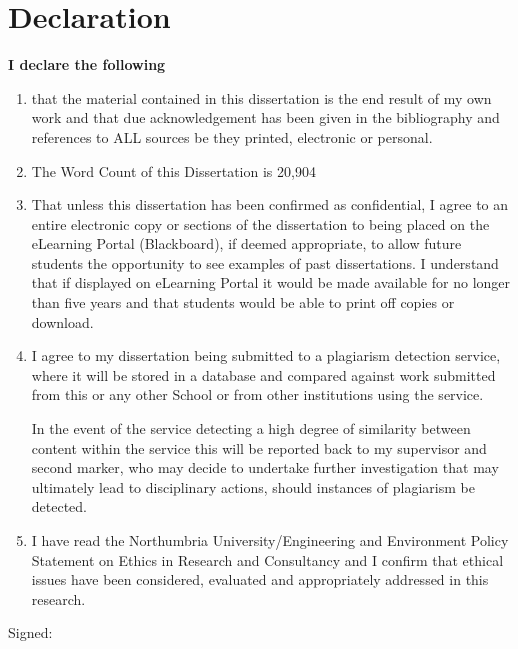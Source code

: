 \chapter{Declaration}

\textbf{\large{I declare the following}}
\begin{enumerate}
	\item that the material contained in this dissertation is the end result of my own work and that
	due acknowledgement has been given in the bibliography and references to ALL sources be
	they printed, electronic or personal.
	
	\item The Word Count of this Dissertation is 20,904
	
	\item That unless this dissertation has been confirmed as confidential, I agree to an entire
	electronic copy or sections of the dissertation to being placed on the eLearning Portal
	(Blackboard), if deemed appropriate, to allow future students the opportunity to see examples
	of past dissertations. I understand that if displayed on eLearning Portal it would be made
	available for no longer than five years and that students would be able to print off copies or
	download.
	
	\item I agree to my dissertation being submitted to a plagiarism detection service, where it will
	be stored in a database and compared against work submitted from this or any other School
	or from other institutions using the service.
	
	In the event of the service detecting a high degree of similarity between content within the
	service this will be reported back to my supervisor and second marker, who may decide to
	undertake further investigation that may ultimately lead to disciplinary actions, should
	instances of plagiarism be detected.
	
	\item I have read the Northumbria University/Engineering and Environment Policy Statement on
	Ethics in Research and Consultancy and I confirm that ethical issues have been considered,
	evaluated and appropriately addressed in this research. \\ 
\end{enumerate}


Signed: \hrulefill \\

\hspace*{0mm}\phantom{Signed: }




